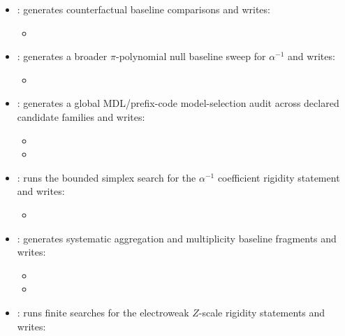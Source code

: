 \begin{sloppypar}
\begin{itemize}
\begin{itemize}
\item {}
\end{itemize}
\item {}: generates counterfactual baseline comparisons and writes:
\begin{itemize}
\item {}
\end{itemize}
\item {}: generates a broader $\pi$-polynomial null baseline sweep for $\alpha^{-1}$ and writes:
\begin{itemize}
\item {}
\end{itemize}
\item {}: generates a global MDL/prefix-code model-selection audit across declared candidate families and writes:
\begin{itemize}
\item {}
\item {}
\end{itemize}
\item {}: runs the bounded simplex search for the $\alpha^{-1}$ coefficient rigidity statement and writes:
\begin{itemize}
\item {}
\end{itemize}
\item {}: generates systematic aggregation and multiplicity baseline fragments and writes:
\begin{itemize}
\item {}
\item {}
\end{itemize}
\item {}: runs finite searches for the electroweak $Z$-scale rigidity statements and writes:
\begin{itemize}

\end{itemize}
\end{itemize}
\end{sloppypar}
